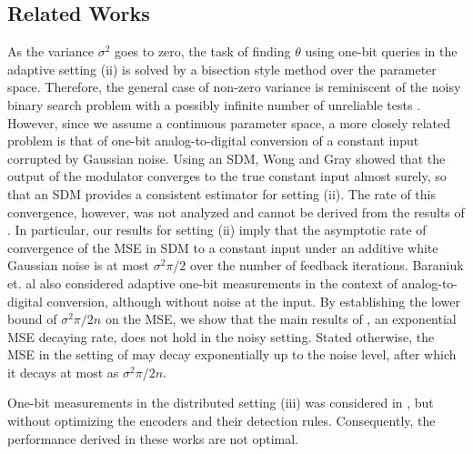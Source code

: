 \documentclass[letterpaper, 11pt]{IEEEtran}      %
\begin{document}
\subsection*{Related Works}
As the variance $\sigma^2$ goes to zero, the task of finding $\theta$ using one-bit queries in the adaptive setting (ii) is solved by a bisection style method over the parameter space. Therefore, the general case of non-zero variance is reminiscent of the noisy binary search problem with a possibly infinite number of unreliable tests \cite{cicalese2002least, Karp:2007:NBS:1283383.1283478}. However, since we assume a continuous parameter space, a more closely related problem is that of one-bit analog-to-digital conversion of a constant input corrupted by Gaussian noise. Using an SDM, Wong and Gray \cite{53738} showed that the output of the modulator converges to the true constant input almost surely, so that an SDM provides a consistent estimator for setting (ii). The rate of this convergence, however, was not analyzed and cannot be derived from the results of \cite{53738}. In particular, our results for setting (ii) imply that the asymptotic rate of convergence of the MSE in SDM to a constant input under an additive white Gaussian noise is at most $\sigma^2\pi/2$ over the number of feedback iterations. Baraniuk et. al \cite{baraniuk2017exponential} also considered adaptive one-bit measurements in the context of analog-to-digital conversion, although without noise at the input. By establishing the lower bound of $\sigma^2\pi/2n$ on the MSE, we show that the main results of \cite{baraniuk2017exponential}, an exponential MSE decaying rate, does not hold in the noisy setting. Stated otherwise, the MSE in the setting of \cite{baraniuk2017exponential} may decay exponentially up to the noise level, after which it decays at most as $\sigma^2\pi/2n$. \par
%
One-bit measurements in the distributed setting (iii) was considered in \cite{904560,4244748, 6882252, chen2010performance, 5184907}, but without optimizing the encoders and their detection rules. Consequently, the performance derived in these works are not optimal. 
\end{document}
